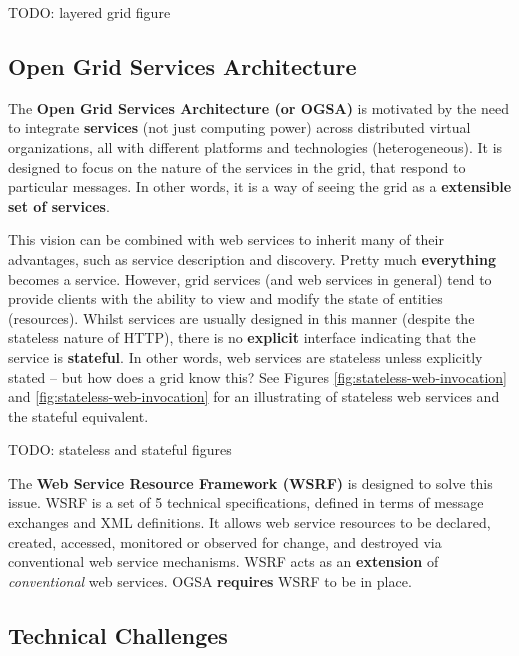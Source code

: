 \documentclass{article}
\begin{document}
TODO: layered grid figure

\subsection{Open Grid Services Architecture}

The \textbf{Open Grid Services Architecture (or OGSA)} is motivated by the need to integrate \textbf{services} (not just computing power) across distributed virtual organizations, all with different platforms and technologies (heterogeneous). It is designed to focus on the nature of the services in the grid, that respond to particular messages. In other words, it is a way of seeing the grid as a \textbf{extensible set of services}.

This vision can be combined with web services to inherit many of their advantages, such as service description and discovery. Pretty much \textbf{everything} becomes a service. However, grid services (and web services in general) tend to provide clients with the ability to view and modify the state of entities (resources). Whilst services are usually designed in this manner (despite the stateless nature of HTTP), there is no \textbf{explicit} interface indicating that the service is \textbf{stateful}. In other words, web services are stateless unless explicitly stated -- but how does a grid know this? See Figures \ref{fig:stateless-web-invocation} and \ref{fig:stateless-web-invocation} for an illustrating of stateless web services and the stateful equivalent.

TODO: stateless and stateful figures

The \textbf{Web Service Resource Framework (WSRF)} is designed to solve this issue. WSRF is a set of 5 technical specifications, defined in terms of message exchanges and XML definitions. It allows web service resources to be declared, created, accessed, monitored or observed for change, and destroyed via conventional web service mechanisms.  WSRF acts as an \textbf{extension} of \textit{conventional} web services. OGSA \textbf{requires} WSRF to be in place.

\subsection{Technical Challenges}
\end{document}
